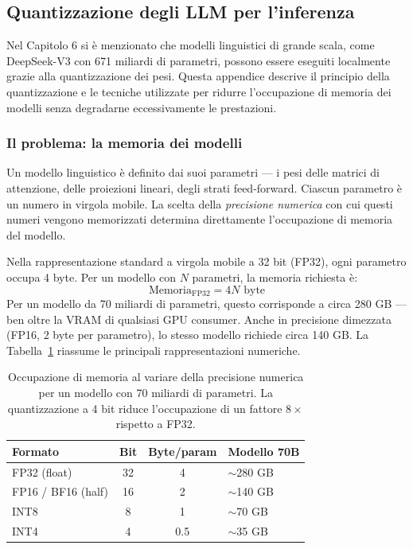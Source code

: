 \clearpage

\subsection{Quantizzazione degli LLM per l'inferenza}
\label{app:quantization}

Nel Capitolo 6 si è menzionato che modelli linguistici di grande scala, come DeepSeek-V3 con 671 miliardi di parametri, possono essere eseguiti localmente grazie alla quantizzazione dei pesi. Questa appendice descrive il principio della quantizzazione e le tecniche utilizzate per ridurre l'occupazione di memoria dei modelli senza degradarne eccessivamente le prestazioni.

\subsubsection{Il problema: la memoria dei modelli}

Un modello linguistico è definito dai suoi parametri --- i pesi delle matrici di attenzione, delle proiezioni lineari, degli strati feed-forward. Ciascun parametro è un numero in virgola mobile. La scelta della \textit{precisione numerica} con cui questi numeri vengono memorizzati determina direttamente l'occupazione di memoria del modello.

Nella rappresentazione standard a virgola mobile a 32 bit (FP32), ogni parametro occupa 4 byte. Per un modello con $N$ parametri, la memoria richiesta è:
\begin{equation}
    \text{Memoria}_{\text{FP32}} = 4N \text{ byte}
\end{equation}
Per un modello da 70 miliardi di parametri, questo corrisponde a circa 280 GB --- ben oltre la VRAM di qualsiasi GPU consumer. Anche in precisione dimezzata (FP16, 2 byte per parametro), lo stesso modello richiede circa 140 GB. La Tabella~\ref{tab:precision} riassume le principali rappresentazioni numeriche.

\begin{table}[h]
\centering
\begin{tabular}{lccl}
\toprule
\textbf{Formato} & \textbf{Bit} & \textbf{Byte/param} & \textbf{Modello 70B} \\
\midrule
FP32 (float) & 32 & 4 & $\sim$280 GB \\
FP16 / BF16 (half) & 16 & 2 & $\sim$140 GB \\
INT8 & 8 & 1 & $\sim$70 GB \\
INT4 & 4 & 0.5 & $\sim$35 GB \\
\bottomrule
\end{tabular}
\caption{Occupazione di memoria al variare della precisione numerica per un modello con 70 miliardi di parametri. La quantizzazione a 4 bit riduce l'occupazione di un fattore $8\times$ rispetto a FP32.}
\label{tab:precision}
\end{table}

